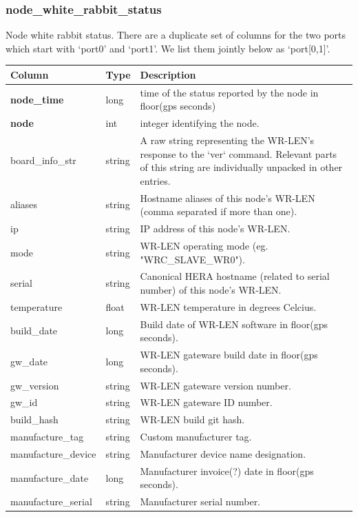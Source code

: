 \documentclass{article}
\begin{document}
{\subsubsection{node\_white\_rabbit\_status}
Node white rabbit status. There are a duplicate set of columns for the two ports which start with `port0' and `port1'.
We list them jointly below as `port[0,1]'.
\begin{center}
 \begin{tabular}{| p{5cm} | p{2cm} | p{10cm} |}
\hline
 {\bf Column} & {\bf Type}  & {\bf Description} \\ [0.5ex]  \hline\hline
\textbf{node\_time} & long & time of the status reported by the node in floor(gps seconds)\\ \hline
\textbf{node} & int & integer identifying the node. \\ \hline
board\_info\_str & string & A raw string representing the WR-LEN's response to the `ver` command.
	Relevant parts of this string are individually unpacked in other entries. \\\hline
aliases & string & Hostname aliases of this node's WR-LEN (comma separated if more than one). \\\hline
ip & string & IP address of this node's WR-LEN. \\\hline
mode & string & WR-LEN operating mode (eg. "WRC\_SLAVE\_WR0"). \\\hline
serial & string & Canonical HERA hostname (related to serial number) of this node's WR-LEN. \\\hline
temperature & float & WR-LEN temperature in degrees Celcius. \\\hline
build\_date & long & Build date of WR-LEN software in floor(gps seconds). \\\hline
gw\_date & long & WR-LEN gateware build date in floor(gps seconds). \\\hline
gw\_version & string & WR-LEN gateware version number. \\\hline
gw\_id & string & WR-LEN gateware ID number. \\\hline
build\_hash & string & WR-LEN build git hash. \\\hline
manufacture\_tag & string & Custom manufacturer tag. \\\hline
manufacture\_device & string & Manufacturer device name designation. \\\hline
manufacture\_date & long & Manufacturer invoice(?) date in floor(gps seconds). \\\hline
manufacture\_serial & string & Manufacturer serial number. \\\hline

\end{tabular}
\end{center}}
\end{document}
